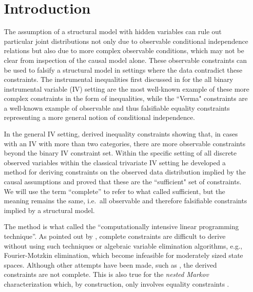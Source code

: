 \documentclass[12pt]{article}
\def\spacingset#1{\renewcommand{\baselinestretch}%
{#1}\small\normalsize} \spacingset{1}
\begin{document}
\newpage
\spacingset{2}
\vspace{-1cm}

\section{Introduction}


The assumption of a structural model with hidden variables can rule out particular joint distributions not only due to observable conditional independence relations but also due to more complex observable conditions, which may not be clear from inspection of the causal model alone. These observable constraints can be used to falsify a structural model in settings where the data contradict these constraints. The instrumental inequalities first discussed in \citet{pearl1995testability} for the all binary instrumental variable (IV) setting are the most well-known example of these more complex constraints in the form of inequalities, while the ``Verma" constraints \citep{verma2022equivalence} are a well-known example of observable and thus falsifiable equality constraints representing a more general notion of conditional independence. 

In the general IV setting, \citet{bonet2001instrumentality} derived inequality constraints showing that, in cases with an IV with more than two categories, there are more observable constraints beyond the binary IV constraint set. Within the specific setting of all discrete observed variables within the classical trivariate IV setting he developed a method for deriving constraints on the observed data distribution implied by the causal assumptions and proved that these are the ``sufficient" set of constraints. We will use the term ``complete'' to refer to what \citeauthor{bonet2001instrumentality} called sufficient, but the meaning remains the same, i.e.~all observable and therefore falsifiable constraints implied by a structural model.  

The \citet{bonet2001instrumentality} method is what \citet{evans2012graphical} called the ``computationally intensive linear programming technique''. As pointed out by \citet{evans2012graphical}, complete constraints are difficult to derive without using such techniques or algebraic variable elimination algorithms, e.g., Fourier-Motzkin elimination, which become infeasible for moderately sized state spaces. Although other attempts have been made, such as \citet{kang2006inequality}, the derived constraints are not complete. This is also true for the \emph{nested Markov} characterization which, by construction, only involves equality constraints \citep{evans2019smooth, shpitser2012parameter, verma2022equivalence, richardson2023nested}.
\end{document}
